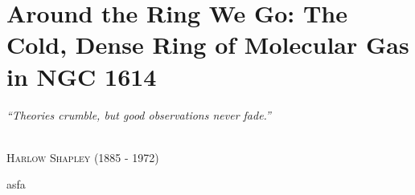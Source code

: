 \pagestyle{fancy}
\headheight 20pt
\chead{}
\lfoot{}
\cfoot{\thepage}
\rfoot{}
\renewcommand{\headrulewidth}{0.1pt}
\renewcommand{\footrulewidth}{0.1pt}
\setlength{\epigraphwidth}{5.in}
\chapter{Around the Ring We Go: The Cold, Dense Ring of Molecular Gas in NGC 1614} \label{chapter2} 
\thispagestyle{fancy} 

\linespread{1.5}
\epigraph{%
\normalsize \textit{``Theories crumble, but good observations never fade.''}}
  {\normalsize \textsc{\\ Harlow Shapley} (1885 - 1972)}
  
  asfa
%


%